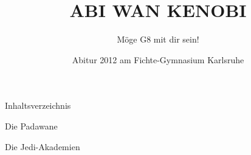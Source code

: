 
\usepackage{pdfpages}

\AddEverypageHook{\ifnum\value{usegfc}=1 \makegbg \makefoot \fi}

\title{ABI WAN KENOBI}
\subtitle{\vspace{1cm}Möge G8 mit dir sein!}
\author{\vspace{2cm}}
\date{\Dekar Abitur 2012 am Fichte-Gymnasium Karlsruhe}
\maketitle
\thispagestyle{empty}
\newpage


\newpage


\newpage

Inhaltsverzeichnis

\renewcommand{\generictitle}{die padawane}
\cleardoublepage
Die Padawane
\newpage
\gfon



\renewcommand{\generictitle}{die jedi-akademien}
\cleardoublepage
\newpage
Die Jedi-Akademien



%


%


%


